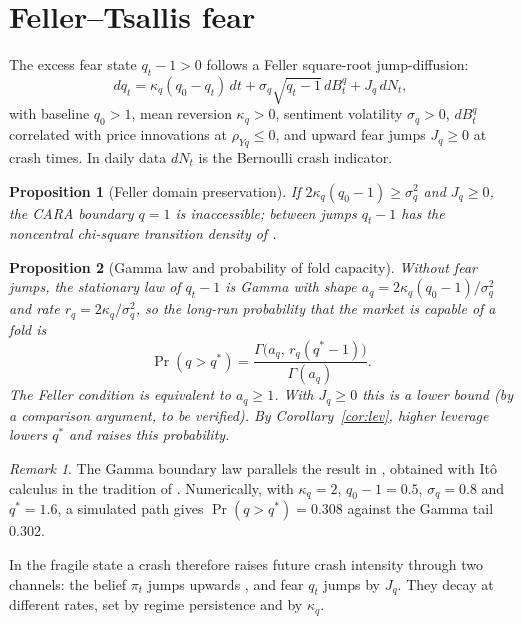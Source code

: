 \documentclass[11pt,a4paper]{article}
\newtheorem{proposition}{Proposition}
\theoremstyle{remark}
\newtheorem*{remark}{Remark}
\begin{document}
\section{Feller--Tsallis fear}

The excess fear state $q_t-1>0$ follows a Feller square-root jump-diffusion:
\begin{equation}\label{eq:feller}
dq_t=\kappa_q(q_0-q_t)\,dt+\sigma_q\sqrt{q_t-1}\,dB^q_t+J_q\,dN_t,
\end{equation}
with baseline $q_0>1$, mean reversion $\kappa_q>0$, sentiment volatility $\sigma_q>0$,
$dB^q_t$ correlated with price innovations at $\rho_{Yq}\le0$, and upward fear jumps
$J_q\ge0$ at crash times. In daily data $dN_t$ is the Bernoulli crash indicator.

\begin{proposition}[Feller domain preservation]\label{prop:feller}
If $2\kappa_q(q_0-1)\ge\sigma_q^2$ and $J_q\ge0$, the CARA boundary $q=1$ is inaccessible;
between jumps $q_t-1$ has the noncentral chi-square transition density of \citet{CIR1985}.
\end{proposition}

\begin{proposition}[Gamma law and probability of fold capacity]\label{prop:gamma}
Without fear jumps, the stationary law of $q_t-1$ is Gamma with shape
$a_q=2\kappa_q(q_0-1)/\sigma_q^2$ and rate $r_q=2\kappa_q/\sigma_q^2$, so the long-run
probability that the market is capable of a fold is
\[
\Pr(q>q^*)=\frac{\Gamma\big(a_q,\,r_q(q^*-1)\big)}{\Gamma(a_q)} .
\]
The Feller condition is equivalent to $a_q\ge1$. With $J_q\ge0$ this is a lower bound (by a
comparison argument, to be verified). By Corollary~\ref{cor:lev}, higher leverage lowers
$q^*$ and raises this probability.
\end{proposition}

\begin{remark}
The Gamma boundary law parallels the result in \citet{Giorno1993}, obtained with It\^o
calculus in the tradition of \citet{LiptserShiryaev2001}. Numerically, with $\kappa_q=2$,
$q_0-1=0.5$, $\sigma_q=0.8$ and $q^*=1.6$, a simulated path gives $\Pr(q>q^*)=0.308$
against the Gamma tail $0.302$.
\end{remark}

\noindent In the fragile state a crash therefore raises future crash intensity through two
channels: the belief $\pi_t$ jumps upwards \citep{Wonham1964,Bremaud1981}, and fear $q_t$
jumps by $J_q$. They decay at different rates, set by regime persistence and by $\kappa_q$.
\end{document}
